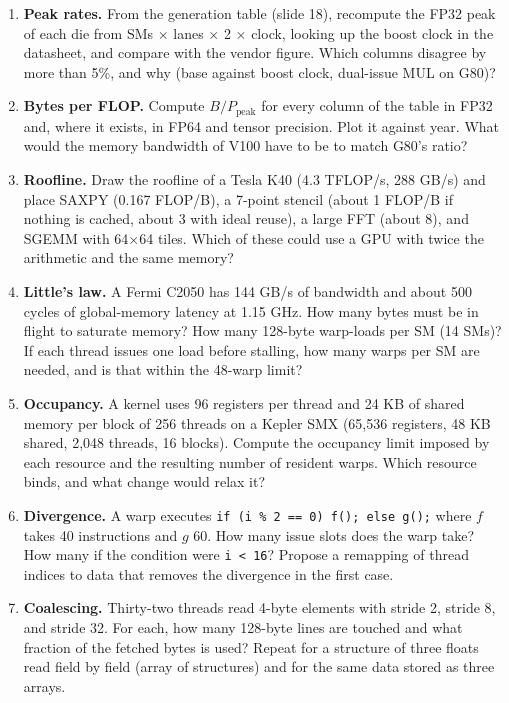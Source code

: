 \documentclass[11pt,letterpaper]{article}
\begin{document}
\begin{enumerate}[leftmargin=1.6em,itemsep=6pt]
\item \textbf{Peak rates.} From the generation table (slide 18), recompute the FP32 peak of each die from SMs $\times$ lanes $\times$ 2 $\times$ clock, looking up the boost clock in the datasheet, and compare with the vendor figure. Which columns disagree by more than 5\%, and why (base against boost clock, dual-issue MUL on G80)?
\item \textbf{Bytes per FLOP.} Compute $B/P_{\text{peak}}$ for every column of the table in FP32 and, where it exists, in FP64 and tensor precision. Plot it against year. What would the memory bandwidth of V100 have to be to match G80's ratio?
\item \textbf{Roofline.} Draw the roofline of a Tesla K40 (4.3 TFLOP/s, 288 GB/s) and place SAXPY (0.167 FLOP/B), a 7-point stencil (about 1 FLOP/B if nothing is cached, about 3 with ideal reuse), a large FFT (about 8), and SGEMM with 64$\times$64 tiles. Which of these could use a GPU with twice the arithmetic and the same memory?
\item \textbf{Little's law.} A Fermi C2050 has 144 GB/s of bandwidth and about 500 cycles of global-memory latency at 1.15 GHz. How many bytes must be in flight to saturate memory? How many 128-byte warp-loads per SM (14 SMs)? If each thread issues one load before stalling, how many warps per SM are needed, and is that within the 48-warp limit?
\item \textbf{Occupancy.} A kernel uses 96 registers per thread and 24 KB of shared memory per block of 256 threads on a Kepler SMX (65{,}536 registers, 48 KB shared, 2{,}048 threads, 16 blocks). Compute the occupancy limit imposed by each resource and the resulting number of resident warps. Which resource binds, and what change would relax it?
\item \textbf{Divergence.} A warp executes \texttt{if (i \% 2 == 0) f(); else g();} where $f$ takes 40 instructions and $g$ 60. How many issue slots does the warp take? How many if the condition were \texttt{i < 16}? Propose a remapping of thread indices to data that removes the divergence in the first case.
\item \textbf{Coalescing.} Thirty-two threads read 4-byte elements with stride 2, stride 8, and stride 32. For each, how many 128-byte lines are touched and what fraction of the fetched bytes is used? Repeat for a structure of three floats read field by field (array of structures) and for the same data stored as three arrays.

\end{enumerate}
\end{document}
